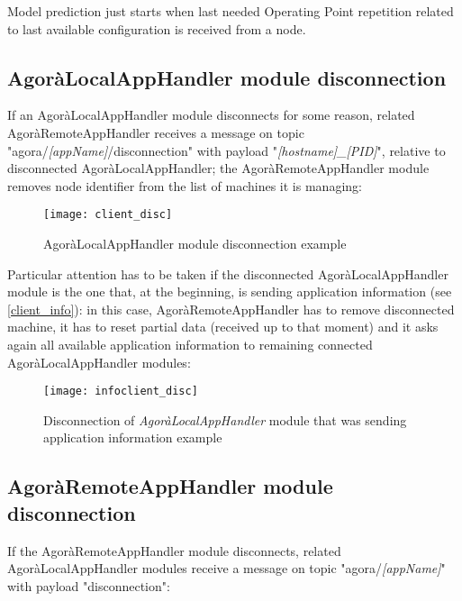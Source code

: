 Model prediction just starts when last needed Operating Point repetition related to last available configuration is received from a node.





\subsection{AgoràLocalAppHandler module disconnection}\label{client_disc}

If an AgoràLocalAppHandler module disconnects for some reason, related Agorà\-Remote\-App\-Handler receives a message on topic "agora\slash{}\textit{[appName]}\slash{}disconnection" with payload "\textit{[hostname]\_[PID]}", relative to disconnected AgoràLocalAppHandler; the AgoràRemote\-App\-Handler module removes node identifier from the list of machines it is managing:

\begin{figure}[H]

    \centering
    \texttt{[image: client\_disc]}
    \caption{AgoràLocalAppHandler module disconnection example}
    
\end{figure}

Particular attention has to be taken if the disconnected AgoràLocalAppHandler module is the one that, at the beginning, is sending application information (see \ref{client_info}): in this case, AgoràRemoteAppHandler has to remove disconnected machine, it has to reset partial data (received up to that moment) and it asks again all available application information to remaining connected Agorà\-Local\-App\-Handler modules:

\begin{figure}[H]

    \centering
    \texttt{[image: infoclient\_disc]}
    \caption{Disconnection of \textit{AgoràLocalAppHandler} module that was sending application information example}
    
\end{figure}





\subsection{AgoràRemoteAppHandler module disconnection}\label{handler_disc}

If the AgoràRemoteAppHandler module disconnects, related AgoràLocalAppHandler modules receive a message on topic "agora\slash{}\textit{[appName]}" with payload "disconnection":

